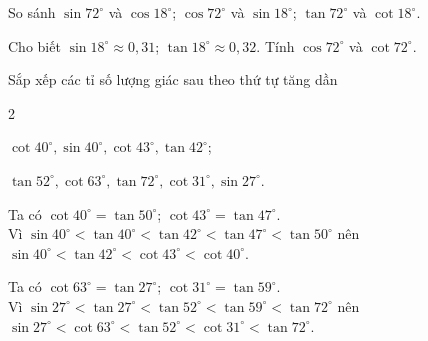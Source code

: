 \begin{bt}
	\begin{listEX}
	\item So sánh $\sin 72^\circ$ và $\cos 18^\circ$; $ \cos 72^\circ$ và $\sin 18^\circ$; $\tan 72^\circ$ và $\cot 18^\circ$.
	\item Cho biết $\sin 18^\circ\approx 0{,}31$; $\tan 18^\circ\approx 0{,}32$. Tính $\cos 72^\circ$ và $\cot 72^\circ$.
	\end{listEX}
\end{bt}
\begin{bt}%
	Sắp xếp các tỉ số lượng giác sau theo thứ tự tăng dần
	\begin{enumEX}{2}
	\item $\cot40^{\circ},\sin 40^{\circ},\cot43^{\circ},\tan42^{\circ}$;
	\item $\tan52^{\circ},\cot63^{\circ},\tan72^{\circ},\cot31^{\circ},\sin 27^{\circ}$.
	\end{enumEX}
	\loigiai
	{
	\begin{listEX}
	\item Ta có $\cot40^{\circ}=\tan50^{\circ}$; $\cot43^{\circ}=\tan47^{\circ}$.\\
	Vì $\sin 40^{\circ}<\tan40^{\circ}<\tan42^{\circ}<\tan47^{\circ}<\tan50^{\circ}$ nên $\sin 40^{\circ}<\tan42^{\circ}<\cot43^{\circ}<\cot40^{\circ}$.
	\item Ta có $\cot63^{\circ}=\tan27^{\circ}$; $\cot31^{\circ}=\tan59^{\circ}$.\\
	Vì $\sin 27^{\circ}<\tan27^{\circ}<\tan52^{\circ}<\tan59^{\circ}<\tan72^{\circ}$ nên $\sin 27^{\circ}<\cot63^{\circ}<\tan52^{\circ}<\cot31^{\circ}<\tan72^{\circ}$.
	\end{listEX}
	}
\end{bt}